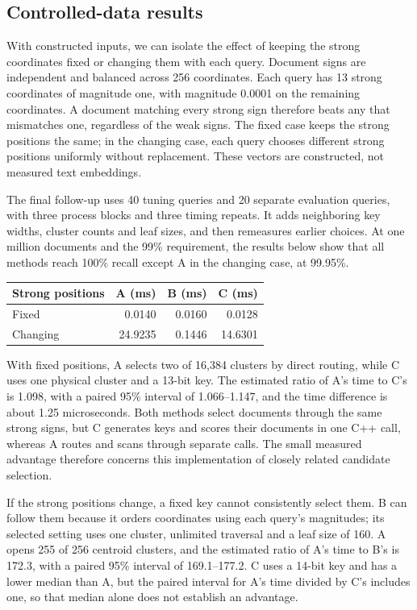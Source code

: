 \subsection{Controlled-data results}
With constructed inputs, we can isolate the effect of keeping the strong coordinates fixed
or changing them with each query. Document signs are independent and balanced across 256
coordinates. Each query has 13 strong coordinates of magnitude one, with magnitude 0.0001
on the remaining coordinates. A document matching every strong sign therefore beats any
that mismatches one, regardless of the weak signs. The fixed case keeps the strong positions
the same; in the changing case, each query chooses different strong positions uniformly
without replacement. These vectors are constructed, not measured text embeddings.

The final follow-up uses 40 tuning queries and 20 separate evaluation queries, with three
process blocks and three timing repeats. It adds neighboring key widths, cluster counts and
leaf sizes, and then remeasures earlier choices. At one million documents and the 99\%
requirement, the results below show that all methods reach 100\% recall except A in the
changing case, at 99.95\%.

\begin{center}
\begin{tabular}{@{}lrrr@{}}
\toprule
Strong positions & A (ms) & B (ms) & C (ms)\\
\midrule
Fixed & 0.0140 & 0.0160 & 0.0128\\
Changing & 24.9235 & 0.1446 & 14.6301\\
\bottomrule
\end{tabular}
\end{center}

With fixed positions, A selects two of 16,384 clusters by direct routing, while C uses one
physical cluster and a 13-bit key. The estimated ratio of A's time to C's is 1.098, with a paired 95\% interval
of 1.066--1.147, and the time difference is about 1.25 microseconds. Both methods select
documents through the same strong signs, but C generates keys and scores their documents in one
C++ call, whereas A routes and scans through separate calls. The small measured advantage
therefore concerns this implementation of closely related candidate selection.

If the strong positions change, a fixed key cannot consistently select them. B can follow
them because it orders coordinates using each query's magnitudes; its selected setting uses
one cluster, unlimited traversal and a leaf size of 160. A opens 255 of 256 centroid clusters,
and the estimated ratio of A's time to B's is 172.3, with a paired 95\% interval of 169.1--177.2. C uses a
14-bit key and has a lower median than A, but the paired interval for A's time divided by C's includes one,
so that median alone does not establish an advantage.

